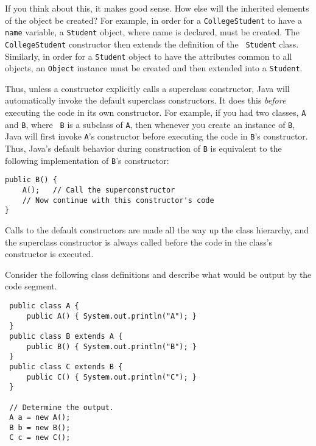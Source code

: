 If you think about this, it makes good sense. How else will the
inherited elements of the object be created? For example, in order for
a {\tt CollegeStudent} to have a {\tt name} variable, a {\tt Student}
object, where name is declared, must be created. The {\tt
CollegeStudent} constructor then extends the definition of the {\tt
Student} class.  Similarly, in order for a {\tt Student} object to
have the attributes common to all objects, an {\tt Object} instance
must be created and then extended into a {\tt Student}.

Thus, unless a constructor explicitly calls a superclass constructor,
Java will automatically invoke the default superclass constructors.
It does this {\em before} executing the code in its own constructor.
For example, if you had two classes, {\tt A} and {\tt B}, where {\tt
B} is a subclass of {\tt A}, then whenever you create an instance of
{\tt B}, Java will first invoke {\tt A}'s constructor before executing
the code in {\tt B}'s constructor.  Thus, Java's default behavior
during construction of {\tt B} is equivalent to the following
implementation of {\tt B}'s constructor:

\begin{jjjlisting}
\begin{lstlisting}
public B() {
    A();   // Call the superconstructor 
    // Now continue with this constructor's code
}
\end{lstlisting}
\end{jjjlisting}

\noindent Calls to the default constructors are made all the way
up the class hierarchy, and the superclass constructor is always
called before the code in the class's constructor is executed.

\begin{SSTUDY}

\item  Consider the following class definitions and describe what would
be output by the code segment.

\begin{jjjlisting}
\begin{lstlisting}
 public class A {
     public A() { System.out.println("A"); }
 }
 public class B extends A {
     public B() { System.out.println("B"); }
 }
 public class C extends B {
     public C() { System.out.println("C"); }
 }

 // Determine the output.
 A a = new A();
 B b = new B();
 C c = new C();
\end{lstlisting}
\end{jjjlisting}

\end{SSTUDY}

